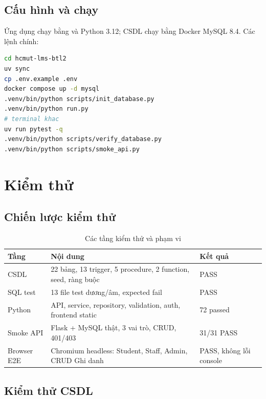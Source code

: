 \documentclass[a4paper,13pt]{extarticle}
\providecommand{\Tbl}[1]{\texttt{\detokenize{#1}}}
\begin{document}
\subsection{Cấu hình và chạy}

Ứng dụng chạy bằng \Tbl{uv} và Python 3.12; CSDL chạy bằng Docker MySQL 8.4. Các lệnh
chính:

\begin{lstlisting}[style=sqlstyle,language=bash,caption={Lệnh chạy ứng dụng và kiểm thử},label={lst:run}]
cd hcmut-lms-btl2
uv sync
cp .env.example .env
docker compose up -d mysql
.venv/bin/python scripts/init_database.py
.venv/bin/python run.py
# terminal khac
uv run pytest -q
.venv/bin/python scripts/verify_database.py
.venv/bin/python scripts/smoke_api.py
\end{lstlisting}

\section{Kiểm thử}

\subsection{Chiến lược kiểm thử}

\begin{table}[H]
\centering
\caption{Các tầng kiểm thử và phạm vi}
\label{tab:test-layers}
\begin{tabular}{@{}L{3.6cm}L{6.4cm}L{4.4cm}@{}}
\toprule
{}
\textbf{Tầng} & \textbf{Nội dung} & \textbf{Kết quả} \\
\midrule
CSDL & 22 bảng, 13 trigger, 5 procedure, 2 function, seed, ràng buộc & PASS \\
SQL test & 13 file test dương/âm, expected fail & PASS \\
Python & API, service, repository, validation, auth, frontend static & 72 passed \\
Smoke API & Flask + MySQL thật, 3 vai trò, CRUD, 401/403 & 31/31 PASS \\
Browser E2E & Chromium headless: Student, Staff, Admin, CRUD Ghi danh & PASS, không lỗi console \\
\bottomrule
\end{tabular}
\end{table}

\subsection{Kiểm thử CSDL}
\end{document}
